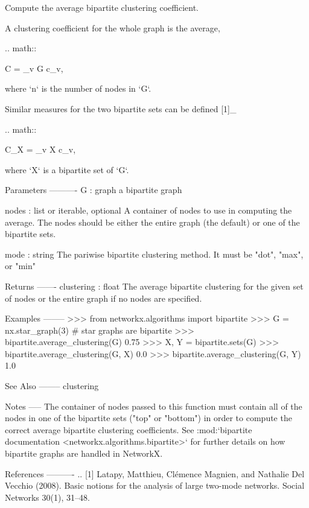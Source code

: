 \begin{DoxyVerb}Compute the average bipartite clustering coefficient.

A clustering coefficient for the whole graph is the average,

.. math::

   C = \sum_{v \in G} c_v,

where `n` is the number of nodes in `G`.

Similar measures for the two bipartite sets can be defined [1]_

.. math::

   C_X = \sum_{v \in X} c_v,

where `X` is a bipartite set of `G`.

Parameters
----------
G : graph
    a bipartite graph

nodes : list or iterable, optional
    A container of nodes to use in computing the average.
    The nodes should be either the entire graph (the default) or one of the
    bipartite sets.

mode : string
    The pariwise bipartite clustering method.
    It must be "dot", "max", or "min"

Returns
-------
clustering : float
   The average bipartite clustering for the given set of nodes or the
   entire graph if no nodes are specified.

Examples
--------
>>> from networkx.algorithms import bipartite
>>> G = nx.star_graph(3)  # star graphs are bipartite
>>> bipartite.average_clustering(G)
0.75
>>> X, Y = bipartite.sets(G)
>>> bipartite.average_clustering(G, X)
0.0
>>> bipartite.average_clustering(G, Y)
1.0

See Also
--------
clustering

Notes
-----
The container of nodes passed to this function must contain all of the nodes
in one of the bipartite sets ("top" or "bottom") in order to compute
the correct average bipartite clustering coefficients.
See :mod:`bipartite documentation <networkx.algorithms.bipartite>`
for further details on how bipartite graphs are handled in NetworkX.


References
----------
.. [1] Latapy, Matthieu, Clémence Magnien, and Nathalie Del Vecchio (2008).
    Basic notions for the analysis of large two-mode networks.
    Social Networks 30(1), 31--48.
\end{DoxyVerb}
 \mbox{\label{namespacenetworkx_1_1algorithms_1_1bipartite_1_1cluster_aa8749b5dca0aa1986e505e83d0bb90d7}} 

